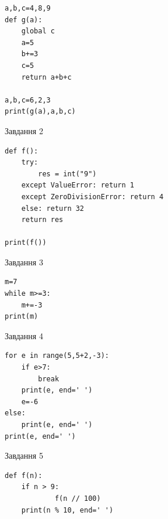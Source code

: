 \documentclass[12pt, ukrainian]{article}
\begin{document}
{{{{{\begin{minipage}[t]{8.5cm}
\begin{verbatim}
a,b,c=4,8,9
def g(a):
    global c
    a=5
    b+=3
    c=5
    return a+b+c

a,b,c=6,2,3
print(g(a),a,b,c)
\end{verbatim}


\vspace{5mm}
               
{\begin{center}Завдання {2}\end{center}}
\vspace{-6mm}

\begin{verbatim}
def f():
    try:
        res = int("9")
    except ValueError: return 1
    except ZeroDivisionError: return 4
    else: return 32
    return res

print(f())
\end{verbatim}


\vspace{5mm}
               
{\begin{center}Завдання {3}\end{center}}
\vspace{-6mm}

\begin{verbatim}
m=7
while m>=3:
    m+=-3
print(m)
\end{verbatim}


\end{minipage}
\vline \hspace{6mm}
\begin{minipage}[t]{10.7cm}
               
{\begin{center}Завдання {4}\end{center}}
\vspace{-6mm}

\begin{verbatim}
for e in range(5,5+2,-3):
    if e>7:
        break
    print(e, end=' ')
    e=-6
else:
    print(e, end=' ')
print(e, end=' ')
\end{verbatim}


\vspace{5mm}
               
{\begin{center}Завдання {5}\end{center}}
\vspace{-6mm}

\begin{verbatim}
def f(n):
    if n > 9:
            f(n // 100)
    print(n % 10, end=' ')
    


\end{verbatim}
\end{minipage}}}}}}
\end{document}
